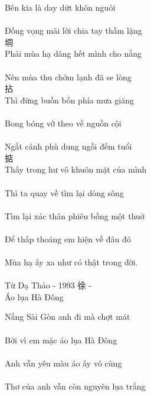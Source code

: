 \documentclass[14pt,a4paper]{extarticle}
\begin{document}
\newpage Bên kia là day dứt khôn nguôi\\[1ex]
{\huge {} \kia {} \day {}  }\\[1ex]
Đồng vọng mãi lời chia tay thầm lặng\\[1ex]
{\huge 垌    \chia \tay {} }\\[1ex]
Phải mùa hạ dâng hết mình cho nắng\\[1ex]
{\huge {}      \cho {}}\\[1ex]
Nên mùa thu chớm lạnh đã se lòng\\[1ex]
{\huge {}  \thu 拈   \se {}}\\[1ex] 
Thì đừng buồn bốn phía mưa giăng\\[1ex]
{\huge {}    𪰂  }\\[1ex]
Bong bóng vỡ theo về nguồn cội\\[1ex]
{\huge 𤂧   \theo {}  }\\[1ex]
Ngắt cánh phù dung ngồi đếm tuổi\\[1ex]
{\huge {}   \dung {} 掂 }\\[1ex]
Thấy trong hư vô khuôn mặt của mình\\[1ex]
{\huge {} \trong {}     }\\[1ex]
Thì ta quay về tìm lại dòng sông\\[1ex]
{\huge {} \ta \quay {}    }\\[1ex]
Tìm lại xác thân phiêu bồng một thuở\\[1ex]
{\huge {}       }\\[1ex]
Để thấp thoáng em hiện về đâu đó\\[1ex]
{\huge {}   \em {}   }\\[1ex]
Mùa hạ ấy xa như có thật trong đời.\\[1ex]
{\huge {}   \xa {}   \trong {}}\\[5ex]
\small Từ Dạ Thảo - 1993 \qquad
{\Large  徐  } - {\Large {}   \ba}\\[1ex]


Áo lụa Hà Đông

{\huge {}   }
\bigskip


Nắng Sài Gòn anh đi mà chợt mát\\[1ex]
{\huge {}\ANH{}}\\[1ex]
Bởi vì em mặc áo lụa Hà Đông\\[1ex]
{\huge {}\em{}}\\[1ex]
Anh vẫn yêu màu áo ấy vô cùng\\[1ex]
{\huge \ANH{}}\\[1ex]
Thơ của anh vẫn còn nguyên lụa trắng\\[1ex] \medskip 
{\huge {}\ANH{}}\\[1ex] \medskip 
\end{document}

